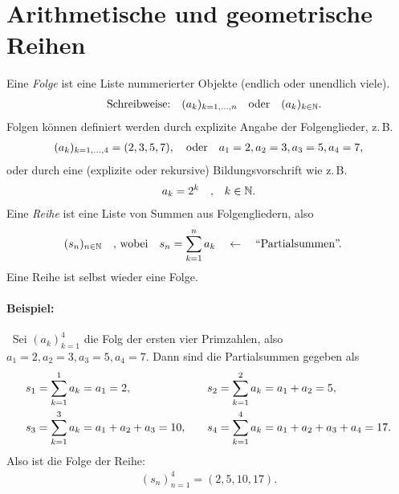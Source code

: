 \section{Arithmetische und geometrische Reihen}

Eine \emph{Folge} ist eine Liste nummerierter Objekte (endlich oder unendlich viele).
\begin{align}
    \qq{Schreibweise:} (a_k)_{k=1,\hdots,n} \qq{oder} (a_k)_{k\in\mathbb{N}}.
\end{align}
Folgen können definiert werden durch explizite Angabe der Folgenglieder, z.\,B. 
\begin{align}
    (a_k)_{k=1,\hdots,4} = (2,3,5,7), \qq{oder} a_1 = 2, a_2=3, a_3=5, a_4 = 7,
\end{align}
oder durch eine (explizite oder rekursive) Bildungsvorschrift wie z.\,B. 
\begin{align}
    a_k = 2^k \qq{,} k\in\mathbb{N}.
\end{align}
Eine \emph{Reihe} ist eine Liste von Summen aus Folgengliedern, also 
\begin{align}
    (s_n)_{n\in\mathbb{N}} \qq{, wobei} s_n = \sum_{k=1}^n a_k  \quad \leftarrow \qq{``Partialsummen''.}
\end{align}
Eine Reihe ist selbst wieder eine Folge. 

\paragraph{Beispiel:}$~$ Sei $(a_k)_{k=1}^4$ die Folg der ersten vier Primzahlen, also $a_1 = 2, a_2 = 3, a_3 = 5, a_4 = 7$. Dann sind die Partialsummen gegeben als 
\begin{alignat}{3}
    s_1 &= \sum_{k=1}^1 a_k = a_1 = 2, \quad & s_2&= \sum_{k=1}^2 a_k = a_1+a_2 = 5, \notag \\
    s_3 &= \sum_{k=1}^3 a_k = a_1 + a_2 + a_3 = 10, \quad & s_4&= \sum_{k=1}^4 a_k = a_1 + a_2 + a_3 + a_4 = 17.
\end{alignat}
Also ist die Folge der Reihe: 
\begin{align}
    (s_n)_{n=1}^4 = (2,5,10,17).
\end{align}

